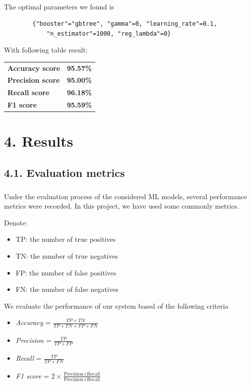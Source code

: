 \documentclass[a4paper]{report}
\begin{document}
	\paragraph{}
	The optimal parameters we found is 
	\begin{verbatim}
		{"booster"="gbtree", "gamma"=0, "learning_rate"=0.1,
			"n_estimator"=1000, "reg_lambda"=0}
	\end{verbatim} 
	
	With following table result:
	
	\begin{center}
		\begin{tabular}{ll}
			\toprule
			\textbf{Accuracy score} & \textbf{95.57\%} \\
			\textbf{Precision score}  & \textbf{95.00\%} \\
			\textbf{Recall score}     & \textbf{96.18\%} \\
			\textbf{F1 score}   & \textbf{95.59\%} \\
			\bottomrule
		\end{tabular}
	\end{center}
	
	
	\chapter*{\huge 4. Results}
	\section*{\Large 4.1. Evaluation metrics}
	\paragraph{} \Large
	Under the evaluation process of the considered ML models, several performance metrics were recorded. In this project, we have used some commonly metrics.
	
	Denote:
	\begin{itemize}
		\item TP: the number of true positives
		\item TN: the number of true negatives
		\item FP: the number of false positives
		\item FN: the number of false negatives
	\end{itemize}
	We evaluate the performance of our system based of the following criteria 
	
	\begin{itemize}
		\item \textit{Accuracy} =  $ \displaystyle \frac{TP + TN}{TP + TN + FP + FN}$
		\item\textit{Precision} = $\displaystyle\frac{TP}{TP + FP}$
		\item \textit{Recall} = $\displaystyle\frac{TP}{TP + FN}$
		\item \textit{F1 score} = $\displaystyle 2 \times \frac{\text{Precision} \times \text{Recall}}{\text{Precision} + \text{Recall}}$
	\end{itemize}
	
\end{document}
